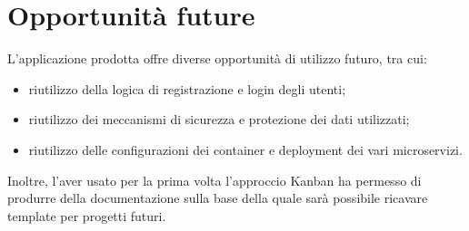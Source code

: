 \documentclass[a4paper,12pt]{article}
\begin{document}
\section{Opportunità future}
L'applicazione prodotta offre diverse opportunità di utilizzo futuro, tra cui:
\begin{itemize}
    \item riutilizzo della logica di registrazione e login degli utenti;
    \item riutilizzo dei meccanismi di sicurezza e protezione dei dati utilizzati;
    \item riutilizzo delle configurazioni dei container e deployment dei vari microservizi.
\end{itemize}
Inoltre, l'aver usato per la prima volta l'approccio Kanban ha permesso di produrre della documentazione sulla base
della quale sarà possibile ricavare template per progetti futuri.
\end{document}

